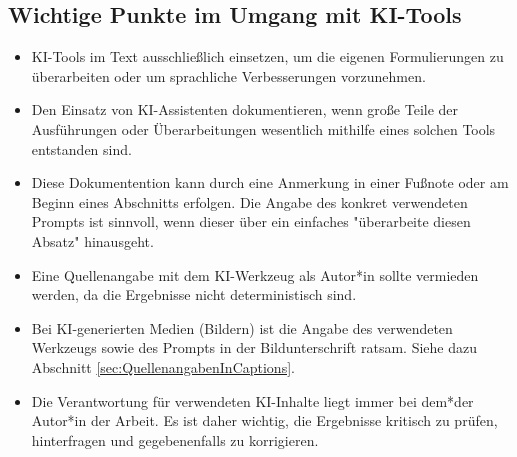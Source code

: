 \subsection{Wichtige Punkte im Umgang mit KI-Tools}

\begin{itemize}
    \item KI-Tools im Text ausschließlich einsetzen, um die eigenen
    Formulierungen zu überarbeiten oder um sprachliche Verbesserungen
    vorzunehmen.
    \item Den Einsatz von KI-Assistenten dokumentieren, wenn große Teile der
    Ausführungen oder Überarbeitungen wesentlich mithilfe eines solchen Tools
    entstanden sind.
    \item Diese Dokumentention kann \zB durch eine Anmerkung in einer Fußnote
    oder am Beginn eines Abschnitts erfolgen. Die Angabe des konkret
    verwendeten Prompts ist sinnvoll, wenn dieser über ein einfaches
    "überarbeite diesen Absatz" hinausgeht.
    \item Eine Quellenangabe mit dem KI-Werkzeug als Autor*in sollte vermieden
    werden, da die Ergebnisse nicht deterministisch sind.
    \item Bei KI-generierten Medien (\zB Bildern) ist die Angabe des
    verwendeten Werkzeugs sowie des Prompts in der Bildunterschrift ratsam.
    Siehe dazu Abschnitt \ref{sec:QuellenangabenInCaptions}.
    \item Die Verantwortung für verwendeten KI-Inhalte liegt immer bei dem*der
    Autor*in der Arbeit. Es ist daher wichtig, die Ergebnisse kritisch zu
    prüfen, hinterfragen und gegebenenfalls zu korrigieren.
\end{itemize}
